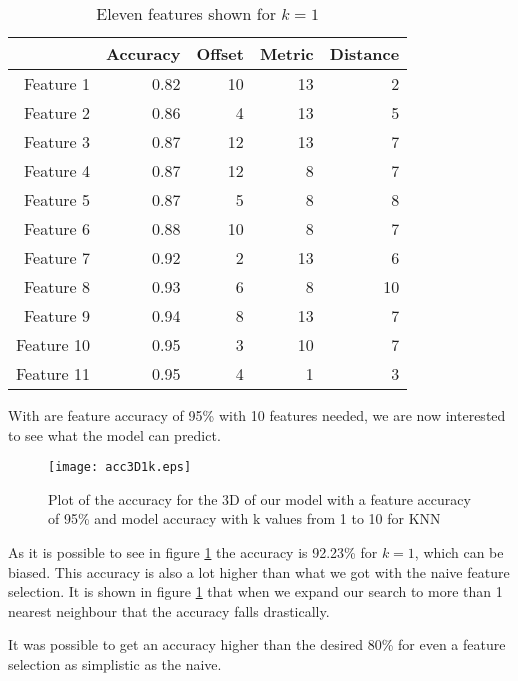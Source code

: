 \begin{table}[H]
  \centering
    \begin{tabular}{|r|r|r|r|r|}
    \hline
          & Accuracy & Offset & Metric & Distance \\
    \hline
    Feature 1 & 0.82  & 10    & 13    & 2 \\
    \hline
    Feature 2 & 0.86  & 4     & 13    & 5 \\
    \hline
    Feature 3 & 0.87  & 12    & 13    & 7 \\
    \hline
    Feature 4 & 0.87  & 12    & 8     & 7 \\
    \hline
    Feature 5 & 0.87  & 5     & 8     & 8 \\
    \hline
    Feature 6 & 0.88  & 10    & 8     & 7 \\
    \hline
    Feature 7 & 0.92  & 2     & 13    & 6 \\
    \hline
    Feature 8 & 0.93  & 6     & 8     & 10 \\
    \hline
    Feature 9 & 0.94  & 8     & 13    & 7 \\
    \hline
    Feature 10 & 0.95  & 3     & 10    & 7 \\
    \hline
    Feature 11 & 0.95  & 4     & 1     & 3 \\
    \hline
    \end{tabular}%
  \caption{Eleven features shown for $k=1$}\label{tab:Features3d1k}%
\end{table}%

With are feature accuracy of 95\% with 10 features needed, we are now interested to see what the model can predict.

\begin{figure}[H]
  \centering
  \texttt{[image: acc3D1k.eps]}
  \caption{Plot of the accuracy for the 3D of our model with a feature accuracy of 95\% and model accuracy with k values from 1 to 10 for KNN}\label{fig:Features3d1k}
\end{figure}

As it is possible to see in figure \ref{fig:Features3d1k} the accuracy is 92.23\% for $k=1$, which can be biased. This accuracy is also a lot higher than what we got with the naive feature selection. It is shown in figure \ref{fig:Features3d1k} that when we expand our search to more than 1 nearest neighbour that the accuracy falls drastically.

It was possible to get an accuracy higher than the desired 80\% for even a feature selection as simplistic as the naive.


